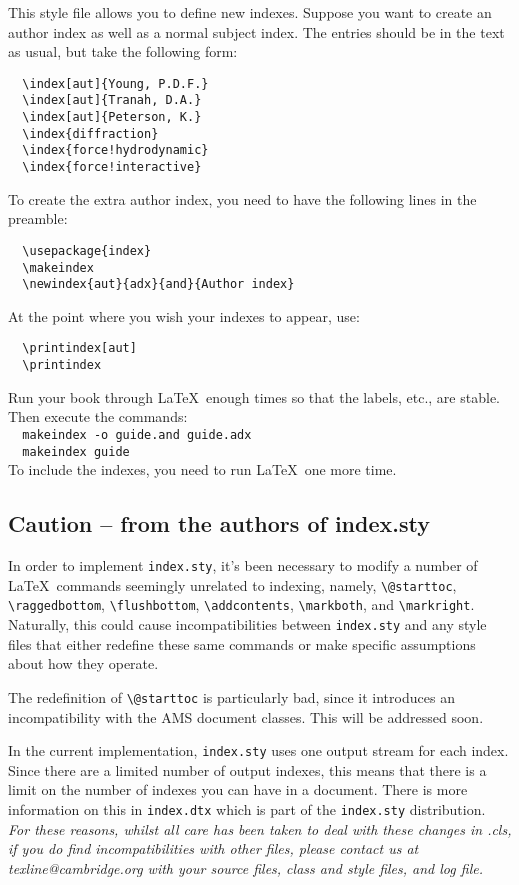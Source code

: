 This style file allows you to define new indexes. Suppose you want to create an author index as well as a normal subject index. The entries should be in the text as usual, but take the following form:
\begin{verbatim}
  \index[aut]{Young, P.D.F.}
  \index[aut]{Tranah, D.A.}
  \index[aut]{Peterson, K.}
  \index{diffraction}
  \index{force!hydrodynamic}
  \index{force!interactive}
\end{verbatim}
To create the extra author index, you need to have the following lines in the preamble:
\begin{verbatim}
  \usepackage{index}
  \makeindex
  \newindex{aut}{adx}{and}{Author index}
\end{verbatim}
At the point where you wish your indexes to appear, use:
\begin{verbatim}
  \printindex[aut]
  \printindex
\end{verbatim}
Run your book through \LaTeX\ enough times so that the labels, etc., are stable. Then execute the commands:\\[0.5\baselineskip]
\verb"  makeindex -o "{\verbatimsize\texttt{\cambridge guide.and \cambridge guide.adx}}\\
\verb"  makeindex "{\verbatimsize\texttt{\cambridge guide}}\\[0.5\baselineskip]
To include the indexes, you need to run \LaTeX\ one more time.

\subsection{Caution -- from the authors of index.sty}

In order to implement \verb"index.sty", it's been necessary to modify a number of \LaTeX\ commands seemingly unrelated to indexing, namely, \verb"\@starttoc", \verb"\raggedbottom", \verb"\flushbottom", \verb"\addcontents", \verb"\markboth", and \verb"\markright". Naturally, this could cause incompatibilities between \verb"index.sty" and any style files that either redefine these same commands or make specific assumptions about how they operate.

The redefinition of \verb"\@starttoc" is particularly bad, since it introduces an incompatibility with the AMS document classes. This will be addressed soon.

In the current implementation, \verb"index.sty" uses one output stream for each index.  Since there are a limited number of output indexes, this means that there is a limit on the number of indexes you can have in a document.  There is more information on this in \verb"index.dtx" which is part of the \verb"index.sty" distribution.\\[\baselineskip]
%
\textit{For these reasons, whilst all care has been taken to deal with these changes in \cambridge.cls, if you do find incompatibilities with other files, please contact us at texline@cambridge.org with your source files, class and style files, and log file.}

\endinput
